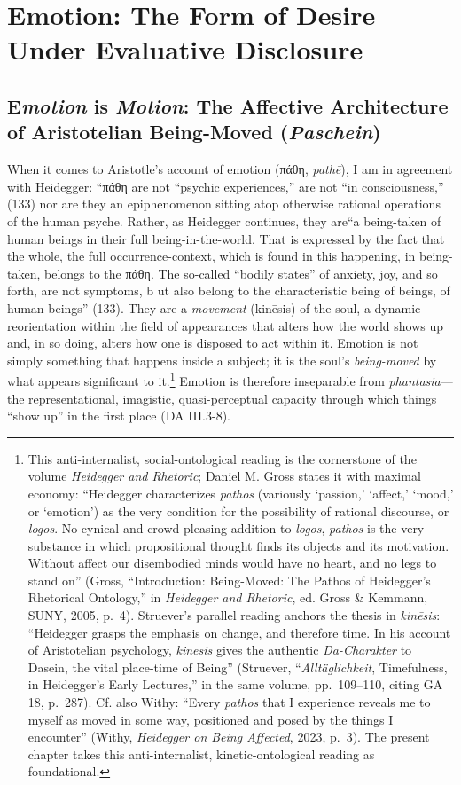 \documentclass{article}
\newcommand{\gk}[1]{{\greekfont #1}}
\begin{document}
\section{Emotion: The Form of Desire Under Evaluative Disclosure}


\subsection{E\textit{motion} is \textit{Motion}: The Affective Architecture of Aristotelian Being-Moved (\textit{Paschein})}

When it comes to Aristotle’s account of emotion (\gk{πάθη}, \textit{pathē}), I am in agreement with Heidegger: ``\gk{πάθη} are not ``psychic experiences,'' are not ``in consciousness,'' (133) nor are they an epiphenomenon sitting atop otherwise rational operations of the human psyche. Rather, as Heidegger continues, they are``a being-taken of human beings in their full being-in-the-world. That is expressed by the fact that the whole, the full occurrence-context, which is found in this happening, in being-taken, belongs to the \gk{πάθη}. The so-called ``bodily states'' of anxiety, joy, and so forth, are not symptoms, b ut also belong to the characteristic being of beings, of human beings'' (133). They are a \textit{movement} (kinēsis) of the soul, a dynamic reorientation within the field of appearances that alters how the world shows up and, in so doing, alters how one is disposed to act within it. Emotion is not simply something that happens inside a subject; it is the soul’s \textit{being-moved} by what appears significant to it.\footnote{This anti-internalist, social-ontological reading is the cornerstone of the volume \textit{Heidegger and Rhetoric}; Daniel M. Gross states it with maximal economy: ``Heidegger characterizes \textit{pathos} (variously `passion,' `affect,' `mood,' or `emotion') as the very condition for the possibility of rational discourse, or \textit{logos}. No cynical and crowd-pleasing addition to \textit{logos}, \textit{pathos} is the very substance in which propositional thought finds its objects and its motivation. Without affect our disembodied minds would have no heart, and no legs to stand on'' (Gross, ``Introduction: Being-Moved: The Pathos of Heidegger's Rhetorical Ontology,'' in \textit{Heidegger and Rhetoric}, ed. Gross \& Kemmann, SUNY, 2005, p.~4). Struever's parallel reading anchors the thesis in \textit{kinēsis}: ``Heidegger grasps the emphasis on change, and therefore time. In his account of Aristotelian psychology, \textit{kinesis} gives the authentic \textit{Da-Charakter} to Dasein, the vital place-time of Being'' (Struever, ``\textit{Alltäglichkeit}, Timefulness, in Heidegger's Early Lectures,'' in the same volume, pp.~109--110, citing GA 18, p.~287). Cf. also Withy: ``Every \textit{pathos} that I experience reveals me to myself as moved in some way, positioned and posed by the things I encounter'' (Withy, \textit{Heidegger on Being Affected}, 2023, p.~3). The present chapter takes this anti-internalist, kinetic-ontological reading as foundational.} Emotion is therefore inseparable from \textit{phantasia}—the representational, imagistic, quasi-perceptual capacity through which things “show up” in the first place (DA III.3-8). 
\end{document}
